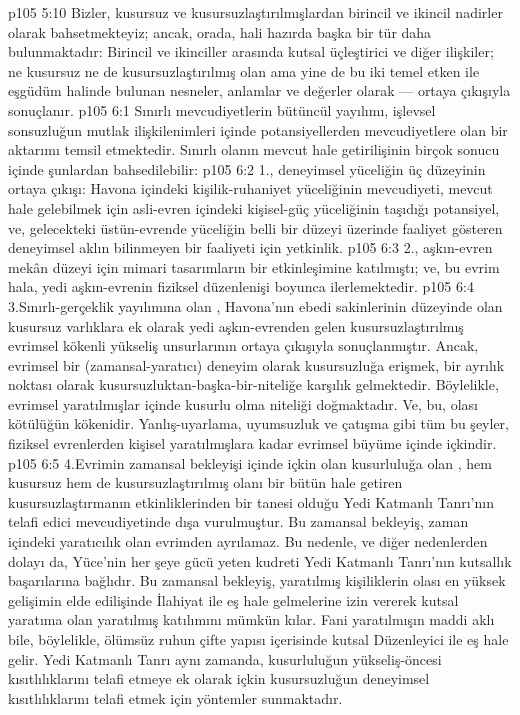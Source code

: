 \vs p105 5:10 Bizler, kusursuz ve kusursuzlaştırılmışlardan birincil ve ikincil nadirler olarak bahsetmekteyiz; ancak, orada, hali hazırda başka bir tür daha bulunmaktadır: Birincil ve ikinciller arasında kutsal üçleştirici ve diğer ilişkiler; ne kusursuz ne de kusursuzlaştırılmış olan ama yine de bu iki temel etken ile eşgüdüm halinde bulunan nesneler, anlamlar ve değerler olarak --- ortaya çıkışıyla sonuçlanır.
\vs p105 6:1 Sınırlı mevcudiyetlerin bütüncül yayılımı, işlevsel sonsuzluğun mutlak ilişkilenimleri içinde potansiyellerden mevcudiyetlere olan bir aktarımı temsil etmektedir. Sınırlı olanın mevcut hale getirilişinin birçok sonucu içinde şunlardan bahsedilebilir:
\vs p105 6:2 1.\bibnobreakspace {}, deneyimsel yüceliğin üç düzeyinin ortaya çıkışı: Havona içindeki kişilik\hyp{}ruhaniyet yüceliğinin mevcudiyeti, mevcut hale gelebilmek için asli\hyp{}evren içindeki kişisel\hyp{}güç yüceliğinin taşıdığı potansiyel, ve, gelecekteki üstün\hyp{}evrende yüceliğin belli bir düzeyi üzerinde faaliyet gösteren deneyimsel aklın bilinmeyen bir faaliyeti için yetkinlik.
\vs p105 6:3 2.\bibnobreakspace {}, aşkın\hyp{}evren mekân düzeyi için mimari tasarımların bir etkinleşimine katılmıştı; ve, bu evrim hala, yedi aşkın\hyp{}evrenin fiziksel düzenlenişi boyunca ilerlemektedir.
\vs p105 6:4 3.\bibnobreakspace Sınırlı\hyp{}gerçeklik yayılımına olan , Havona’nın ebedi sakinlerinin düzeyinde olan kusursuz varlıklara ek olarak yedi aşkın\hyp{}evrenden gelen kusursuzlaştırılmış evrimsel kökenli yükseliş unsurlarının ortaya çıkışıyla sonuçlanmıştır. Ancak, evrimsel bir (zamansal\hyp{}yaratıcı) deneyim olarak kusursuzluğa erişmek, bir ayrılık noktası olarak kusursuzluktan\hyp{}başka\hyp{}bir\hyp{}niteliğe karşılık gelmektedir. Böylelikle, evrimsel yaratılmışlar içinde kusurlu olma niteliği doğmaktadır. Ve, bu, olası kötülüğün kökenidir. Yanlış\hyp{}uyarlama, uyumsuzluk ve çatışma gibi tüm bu şeyler, fiziksel evrenlerden kişisel yaratılmışlara kadar evrimsel büyüme içinde içkindir.
\vs p105 6:5 4.\bibnobreakspace Evrimin zamansal bekleyişi içinde içkin olan kusurluluğa olan , hem kusursuz hem de kusursuzlaştırılmış olanı bir bütün hale getiren kusursuzlaştırmanın etkinliklerinden bir tanesi olduğu Yedi Katmanlı Tanrı’nın telafi edici mevcudiyetinde dışa vurulmuştur. Bu zamansal bekleyiş, zaman içindeki yaratıcılık olan evrimden ayrılamaz. Bu nedenle, ve diğer nedenlerden dolayı da, Yüce’nin her şeye gücü yeten kudreti Yedi Katmanlı Tanrı’nın kutsallık başarılarına bağlıdır. Bu zamansal bekleyiş, yaratılmış kişiliklerin olası en yüksek gelişimin elde edilişinde İlahiyat ile eş hale gelmelerine izin vererek kutsal yaratıma olan yaratılmış katılımını mümkün kılar. Fani yaratılmışın maddi aklı bile, böylelikle, ölümsüz ruhun çifte yapısı içerisinde kutsal Düzenleyici ile eş hale gelir. Yedi Katmanlı Tanrı aynı zamanda, kusurluluğun yükseliş\hyp{}öncesi kısıtlılıklarını telafi etmeye ek olarak içkin kusursuzluğun deneyimsel kısıtlılıklarını telafi etmek için yöntemler sunmaktadır.
